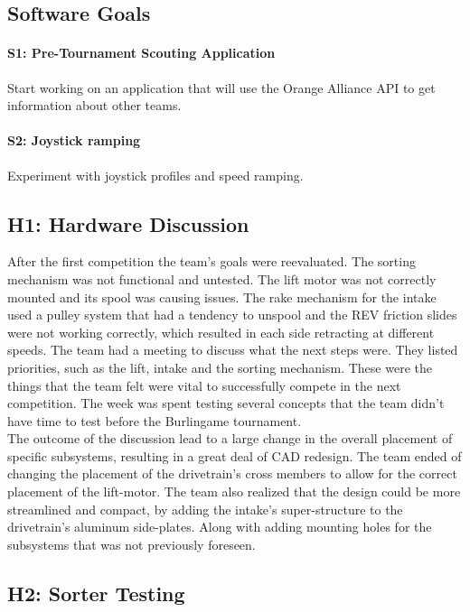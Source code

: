 \documentclass{article}
\begin{document}
\subsection{Software Goals}
\paragraph{S1: Pre-Tournament Scouting Application}
 Start working on an application that will use the Orange Alliance API to get information about other teams. 
\paragraph{S2: Joystick ramping}
Experiment with joystick profiles and speed ramping.
\newpage
\subsection{H1: Hardware Discussion}

After the first competition the team's goals were reevaluated. The sorting mechanism was not functional and untested. The lift motor was not correctly mounted and its spool was causing issues. The rake mechanism for the intake used a pulley system that had a tendency to unspool and the REV friction slides were not working correctly, which resulted in each side retracting at different speeds. The team had a meeting to discuss what the next steps were. They listed priorities, such as the lift, intake and the sorting mechanism. These were the things that the team felt were vital to successfully compete in the next competition. The week was spent testing several concepts that the team didn't have time to test before the Burlingame tournament. \\

The outcome of the discussion lead to a large change in the overall placement of specific subsystems, resulting in a great deal of CAD redesign. The team ended of changing the placement of the drivetrain's cross members to allow for the correct placement of the lift-motor. The team also realized that the design could be more streamlined and compact, by adding the intake's super-structure to the drivetrain's aluminum side-plates. Along with adding mounting holes for the subsystems that was not previously foreseen.  \\


\subsection{H2: Sorter Testing}
\end{document}
